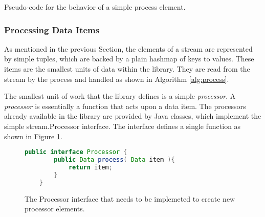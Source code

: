 \begin{algorithm}
\begin{algorithmic}
\Statex
{}
         \Else
         \EndIf
      \EndFor
   \EndWhile
\EndFunction
\end{algorithmic}
\caption{\label{alg:process}Pseudo-code for the behavior of a simple {\ttfamily process} element.}
\end{algorithm}

\subsubsection{Processing Data Items}
As mentioned in the previous Section, the elements of a stream are represented by simple
tuples, which are backed by a plain hashmap of keys to values. These items are the smallest
units of data within the \streams library. They are read from the stream by the process and 
handled as shown in Algorithm \ref{alg:process}. 

The smallest unit of work that the \streams library defines is a simple {\em processor}.
A {\em processor} is essentially a function that acts upon a data item. The processors
already available in the library are provided by Java classes, which implement the
simple {\ttfamily stream.Processor} interface. The interface defines a single function as
shown in Figure \ref{fig:processFunction}.
\begin{figure}[h!]
	\begin{lstlisting}[language=Java,showstringspaces=false]
	public interface Processor {
	    public Data process( Data item ){
	    	return item;
	    }
	}
	\end{lstlisting}
	\caption{\label{fig:processFunction} The {\ttfamily Processor} interface that needs to be implemeted to create new processor elements.}
	\end{figure}